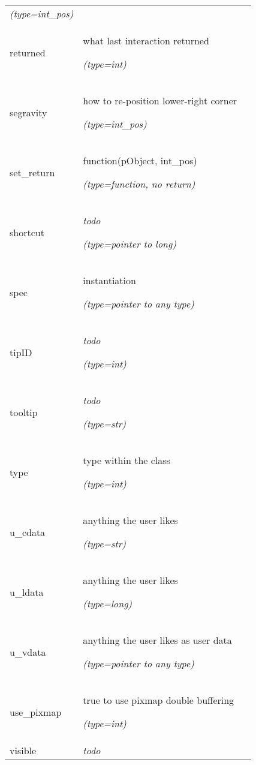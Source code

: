 \begin{longtable}{|p{\varnamewidth}|p{\vardescrwidth}|l}
            {\it (type=int\_pos)}&\\
\cline{1-2}
\raggedright r\-e\-t\-u\-r\-n\-e\-d\- & \raggedright what last interaction returned

            {\it (type=int)}&\\
\cline{1-2}
\raggedright s\-e\-g\-r\-a\-v\-i\-t\-y\- & \raggedright how to re-position lower-right corner

            {\it (type=int\_pos)}&\\
\cline{1-2}
\raggedright s\-e\-t\-\_\-r\-e\-t\-u\-r\-n\- & \raggedright function(pObject, int\_pos)

            {\it (type=function, no return)}&\\
\cline{1-2}
\raggedright s\-h\-o\-r\-t\-c\-u\-t\- & \raggedright \emph{todo}

            {\it (type=pointer to long)}&\\
\cline{1-2}
\raggedright s\-p\-e\-c\- & \raggedright instantiation

            {\it (type=pointer to any type)}&\\
\cline{1-2}
\raggedright t\-i\-p\-I\-D\- & \raggedright \emph{todo}

            {\it (type=int)}&\\
\cline{1-2}
\raggedright t\-o\-o\-l\-t\-i\-p\- & \raggedright \emph{todo}

            {\it (type=str)}&\\
\cline{1-2}
\raggedright t\-y\-p\-e\- & \raggedright type within the class

            {\it (type=int)}&\\
\cline{1-2}
\raggedright u\-\_\-c\-d\-a\-t\-a\- & \raggedright anything the user likes

            {\it (type=str)}&\\
\cline{1-2}
\raggedright u\-\_\-l\-d\-a\-t\-a\- & \raggedright anything the user likes

            {\it (type=long)}&\\
\cline{1-2}
\raggedright u\-\_\-v\-d\-a\-t\-a\- & \raggedright anything the user likes as user data

            {\it (type=pointer to any type)}&\\
\cline{1-2}
\raggedright u\-s\-e\-\_\-p\-i\-x\-m\-a\-p\- & \raggedright true to use pixmap double buffering

            {\it (type=int)}&\\
\cline{1-2}
\raggedright v\-i\-s\-i\-b\-l\-e\- & \raggedright \emph{todo}


\end{longtable}
